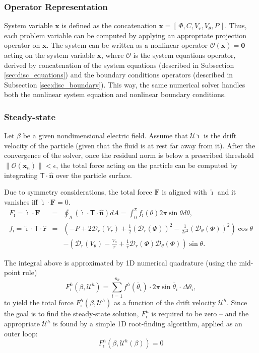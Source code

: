 \documentclass[10pt]{ijnam}
\newcommand{\pars}[1]{\left(#1\right)}
\newcommand\bn{\boldsymbol{\hat{n}}}
\newcommand\bF{\boldsymbol{F}}
\newcommand\bx{\boldsymbol{x}}
\newcommand\br{\boldsymbol{r}}
\newcommand\brhat{\hat{\br}}
\newcommand\bnhat{\hat{\boldsymbol{n}}}
\newcommand\bzero{\boldsymbol{0}}
\newcommand\cO{\mathcal{O}}
\newcommand\cD{\mathcal{D}}
\newcommand\cU{\mathscr{U}}
\newcommand\tT{\mathsf{T}}
\newcommand\ui{\boldsymbol{\hat{\imath}}}
\begin{document}
\subsubsection{Operator Representation}
System variable $\bx$ is defined as the concatenation $\bx = [\,\varPhi, C, V_r, V_\theta, P\,]$.
Thus, each problem variable can be computed by applying an appropriate projection operator on $\bx$.
The system can be written as a nonlinear operator $\cO(\bx) = \bzero$ 
acting on the system variable ${\bx}$, 
where $\cO$ is the system equations operator, 
derived by concatenation of the system equations (described in Subsection \ref{sec:disc_equations})
and the boundary conditions operators (described in Subsection \ref{sec:disc_boundary}).
This way, the same numerical solver handles both the nonlinear system equation and nonlinear
boundary conditions.

\subsubsection{Steady-state}
Let $\beta$ be a given nondimensional electric field.
Assume that $\cU \ui$ is the drift velocity of the particle 
(given that the fluid is at rest far away from it).
After the convergence of the solver, once the residual norm is below
a prescribed threshold $\|\cO(\bx_n)\| < \epsilon$, 
the total force acting on the particle  
can be computed by integrating $\tT \cdot \bn$ over the particle surface.

Due to symmetry considerations, the total force $\bF$ is 
aligned with $\ui$ and it vanishes iff $\ui \cdot \bF = 0$.
\begin{eqnarray} \nonumber
F_\imath = \ui \cdot \bF &=& 
\oint_\mathcal{S} \pars{\ui \cdot \tT \cdot \bnhat} dA = 
\int_0^\pi f_\imath(\theta) 2\pi \sin\theta d\theta ,
\\  
f_\imath = \ui \cdot \tT \cdot \brhat &=& \pars{-P + 2\cD_r(V_r) + 
\frac{1}{2}\pars{\cD_r(\varPhi)}^2 - \frac{1}{2r^2}\pars{\cD_\theta(\varPhi)}^2}\cos\theta 
\\  \nonumber
&& -\pars{\cD_r(V_\theta) - \frac{V_\theta}{r}
+ \frac{1}{r}\cD_r(\varPhi) \cD_{\theta}(\varPhi)}\sin\theta.
\end{eqnarray}

The integral above is approximated by 1D numerical quadrature
(using the mid-point rule)
\begin{equation}
F_\imath^h(\beta, \cU^h) = \sum_{i=1}^{n_\theta} f^h(\bar\theta_i) \cdot 
              2 \pi \sin\bar\theta_i \cdot \Delta\theta_i,
\end{equation}
to yield the total force $F_\imath^h(\beta, \cU^h)$ as a function of the drift velocity $\cU^h$.
Since the goal is to find the steady-state solution, $F_\imath^h$ 
is required to be zero --
and the appropriate $\cU^h$ is found by a simple 1D root-finding algorithm,
applied as an outer loop:
\begin{equation} \label{eq:disc_zero_force}
F_\imath^h(\beta, \cU^h(\beta)) = 0
\end{equation}
\end{document}
